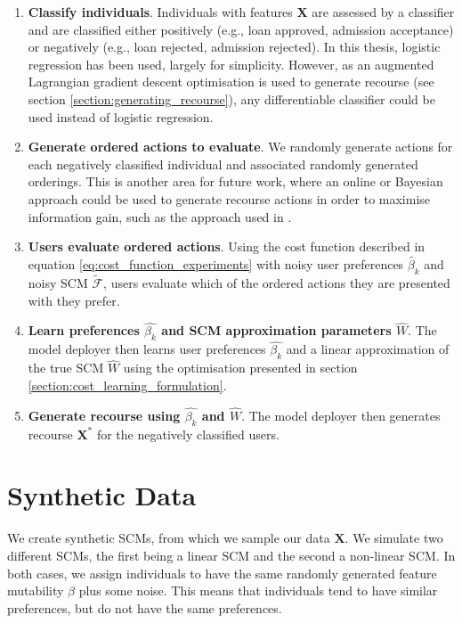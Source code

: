 \begin{enumerate}
	\item \textbf{Classify individuals}. Individuals with features $\mathbf{X}$ are assessed by a classifier and are classified either positively (e.g., loan approved, admission acceptance) or negatively (e.g., loan rejected, admission rejected). In this thesis, logistic regression has been used, largely for simplicity. However, as an augmented Lagrangian gradient descent optimisation is used to generate recourse (see section \ref{section:generating_recourse}), any differentiable classifier could be used instead of logistic regression.
	
	\item \textbf{Generate ordered actions to evaluate}. We randomly generate actions for each negatively classified individual and associated randomly generated orderings. This is another area for future work, where an online or Bayesian approach could be used to generate recourse actions in order to maximise information gain, such as the approach used in \textcite{detoniPersonalizedAlgorithmicRecourse2023}.
	
	\item \textbf{Users evaluate ordered actions}. Using the cost function described in equation \ref{eq:cost_function_experiments} with noisy user preferences $\tilde{\beta_k}$ and noisy SCM $\tilde{\mathcal{F}}$, users evaluate which of the ordered actions they are presented with they prefer. 
	
	\item \textbf{Learn preferences $\hat{\beta_k}$ and SCM approximation parameters $\hat{W}$}. The model deployer then learns user preferences $\hat{\beta_k}$ and a linear approximation of the true SCM $\hat{W}$ using the optimisation presented in section \ref{section:cost_learning_formulation}.
	
	\item \textbf{Generate recourse using $\hat{\beta_k}$ and $\hat{W}$}. The model deployer then generates recourse $\mathbf{X}^*$ for the negatively classified users.
	
\end{enumerate}



\section{Synthetic Data}

We create synthetic SCMs, from which we sample our data $\mathbf{X}$. We simulate two different SCMs, the first being a linear SCM and the second a non-linear SCM. In both cases, we assign individuals to have the same randomly generated feature mutability $\beta$ plus some noise. This means that individuals tend to have similar preferences, but do not have the same preferences.

